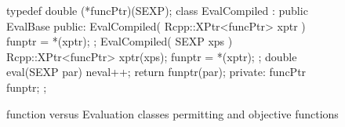 \documentclass[nojss,shortnames,article]{jss}
\begin{document}
\begin{sidewaysfigure}
\begin{minipage}{0.56\linewidth}
\begin{CodeChunk}
\begin{CodeInput}
{{	typedef double (*funcPtr)(SEXP);
	class EvalCompiled : public EvalBase {
	public:
	    EvalCompiled( Rcpp::XPtr<funcPtr> xptr ) {
		funptr = *(xptr);
	    };
	    EvalCompiled( SEXP xps ) {
		Rcpp::XPtr<funcPtr> xptr(xps);
		funptr = *(xptr);
	    };
	    double eval(SEXP par) {
		neval++;
		return funptr(par);
	    }
	private:
	    funcPtr funptr;
	};

    }
}
      \end{CodeInput}
    \end{CodeChunk}
    
    \normalsize {}
  \end{minipage}
  \caption{ function versus Evaluation classes permitting
     and  objective functions}
  \label{fig:evaluate_fun}
\end{sidewaysfigure}



\end{document}
